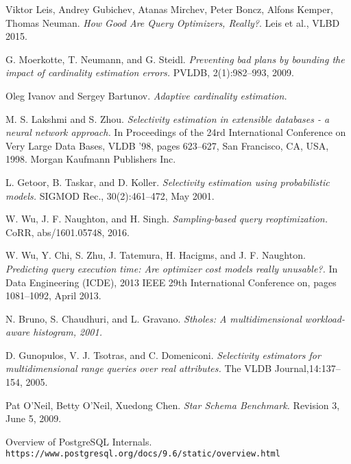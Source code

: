 \renewcommand{\bibname}{REFERENCES}
\begin{thebibliography}{9}
Viktor Leis, Andrey Gubichev, Atanas Mirchev, Peter Boncz, Alfons Kemper, Thomas Neuman.
\textit{How Good Are Query Optimizers, Really?}.
Leis et al., VLBD 2015.

G. Moerkotte, T. Neumann, and G. Steidl.
\textit{Preventing bad plans by bounding the impact of cardinality estimation errors.}
PVLDB, 2(1):982–993, 2009.

Oleg Ivanov and Sergey Bartunov.
\textit{Adaptive cardinality estimation.}

M. S. Lakshmi and S. Zhou.
\textit{Selectivity estimation in extensible databases - a neural network approach.}
In Proceedings of the 24rd International Conference on Very Large Data Bases, VLDB ’98, pages 623–627, San Francisco, CA, USA, 1998. Morgan Kaufmann Publishers Inc.

L. Getoor, B. Taskar, and D. Koller.
\textit{Selectivity estimation using probabilistic models.}
SIGMOD Rec., 30(2):461–472, May 2001.

W. Wu, J. F. Naughton, and H. Singh.
\textit{Sampling-based query reoptimization.}
CoRR, abs/1601.05748, 2016.

W. Wu, Y. Chi, S. Zhu, J. Tatemura, H. Hacigms, and J. F. Naughton.
\textit{Predicting query execution time: Are optimizer cost models really unusable?.}
In Data Engineering (ICDE), 2013 IEEE 29th International Conference on, pages 1081–1092, April 2013.

N. Bruno, S. Chaudhuri, and L. Gravano.
\textit{Stholes: A multidimensional workload-aware histogram, 2001.}

D. Gunopulos, V. J. Tsotras, and C. Domeniconi.
\textit{Selectivity estimators for multidimensional range queries over real attributes.}
The VLDB Journal,14:137–154, 2005.

Pat O'Neil, Betty O'Neil, Xuedong Chen.
\textit{Star Schema Benchmark.}
Revision 3, June 5, 2009.
 
Overview of PostgreSQL Internals.
\\\texttt{https://www.postgresql.org/docs/9.6/static/overview.html} 


\end{thebibliography}
